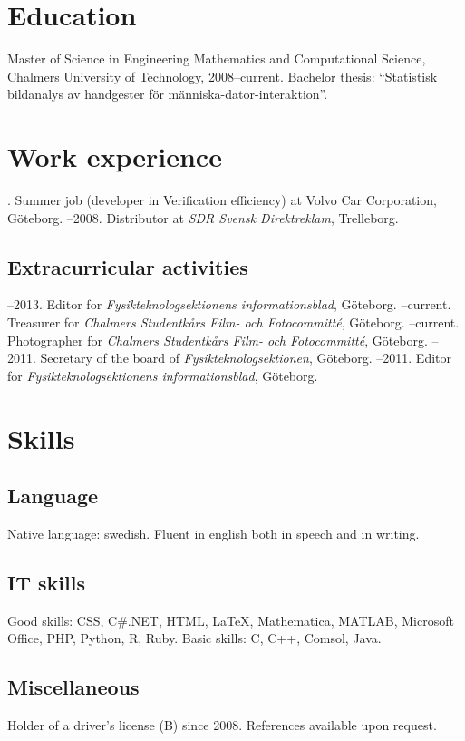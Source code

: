 \documentclass{skvitae}
\author{Simon Sigurdhsson}
\affiliation{}
\begin{document}
	\maketitle

	\section{Education}
	\ind Master of Science in Engineering Mathematics and Computational Science, Chalmers University of Technology, 2008--current. Bachelor thesis: \foreignquote{swedish}{Statistisk bildanalys av handgester för människa-dator-interaktion}.

	\section{Work experience}
	. Summer job (developer in Verification efficiency) at Volvo Car Corporation, Göteborg.
	--2008. Distributor at \emph{SDR Svensk Direktreklam}, Trelleborg.

	\medskip
	\subsection{Extracurricular activities}
	--2013. Editor for \emph{Fysikteknologsektionens informationsblad}, Göteborg.
	--current. Treasurer for \emph{Chalmers Studentkårs Film- och Fotocommitté}, Göteborg.
	--current. Photographer for \emph{Chalmers Studentkårs Film- och Fotocommitté}, Göteborg.
	--2011. Secretary of the board of \emph{Fysikteknologsektionen}, Göteborg.
	--2011. Editor for \emph{Fysikteknologsektionens informationsblad}, Göteborg.

	\section{Skills}
	\subsection{Language}
	\ind Native language: swedish. Fluent in english both in speech and in writing.

	\medskip
	\subsection{IT skills}
	\ind Good skills: CSS, C\#.NET, HTML, \LaTeX, Mathematica, MATLAB, Microsoft Office, PHP, Python, R, Ruby.
	\ind Basic skills: C, C++, Comsol, Java.

	\medskip
	\subsection{Miscellaneous}
	\ind Holder of a driver's license (B) since 2008.
	\ind References available upon request.
\end{document}
